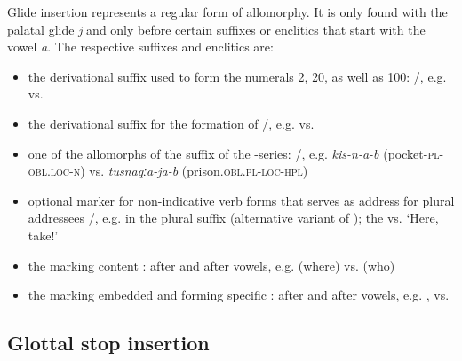 Glide insertion represents a regular form of allomorphy. It is only found with the palatal glide \textit{j} and only before certain suffixes or enclitics that start with the vowel \textit{a}. The respective suffixes and enclitics are:
%
\begin{itemize}
	\item	the derivational suffix used to form the numerals 2, 20, as well as 100: \slash{}, e.g.   vs.   
	\item	the derivational suffix  for the formation of  \slash{}, e.g.   vs.  
	\item	one of the allomorphs of the  suffix of the -series: \slash{}, e.g. \textit{kis-n-a-b}  (pocket-\textsc{pl}-\textsc{obl}.\textsc{loc}-\textsc{n}) vs. \textit{tusnaqːa-ja-b}  (prison.\textsc{obl.pl-loc-hpl}) 
	\item	optional marker for non-indicative verb forms that  serves as address  for plural addressees \slash{}, e.g. in the  plural suffix  (alternative variant of ); the   vs.  `Here, take!'
	\item	the  marking content :  after  and  after vowels, e.g.   (where) vs.   (who)
	\item	the  marking embedded  and forming specific :  after  and  after vowels, e.g.  , 	 vs.   
\end{itemize}



\subsection{Glottal stop insertion}
\label{ssec:Glottal stop insertion}

